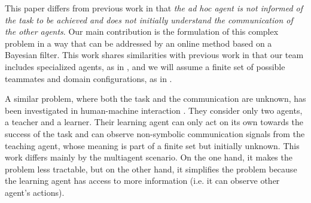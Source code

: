 This paper differs from previous work in that \textit{the ad hoc agent is not informed of the task to be achieved and does not initially understand the communication of the other agents}. Our main contribution is the formulation of this complex problem in a way that can be addressed by an online method based on a Bayesian filter. This work shares similarities with previous work in that our team includes specialized agents, as in \cite{genter2011role}, and we will assume a finite set of possible teammates and domain configurations, as in \cite{genter2011role,barrett2011empirical,barrett2014communicating}.


A similar problem, where both the task and the communication are unknown, has been investigated in human-machine interaction \cite{grizou2014interactive}. They consider only two agents, a teacher and a learner. Their learning agent can only act on its own towards the success of the task and can observe non-symbolic communication signals from the teaching agent, whose meaning is part of a finite set but initially unknown. This work differs mainly by the multiagent scenario. On the one hand, it makes the problem less tractable, but on the other hand, it simplifies the problem because the learning agent has access to more information (i.e. it can observe other agent's actions).



